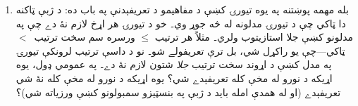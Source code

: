 \documentclass[../../../include/open-logic-section]{subfiles}
\begin{document}
\begin{explain}
\begin{enumerate}
  $\Gamma \setminus \{!A\} \Entails !A$ ثابت کړو۔ دا هم ثابتولے شو
  چې بديهي اصل زائد نۀ دے، که وښيو چې
  $(\Gamma \setminus \{!A\}) \cup \{\lnot !A\}$ د صدق وړ دے۔ د
  بېلګې په توګه، د هندسې د نورو بديهي اصولو څخه د موازي کرښو د اصل
  استقلال همداسې ښودل شوے و۔
\item بله مهمه پوښتنه په يوه تيورۍ کښې د مفاهيمو د تعريفېدنې په باب ده: د
  ژبې ټاکنه دا ټاکي چې د تيورۍ مدلونه له څه جوړ وي۔ خو د تيورۍ هر اړخ
  لازم نۀ دے چې په مدلونو کښې جلا استازيتوب ولري۔ مثلاً هر ترتيب
  $\le$ ورسره سم سخت ترتيب~$<$ ټاکي---چې يو راکړل شي، بل ترې تعريفولے
  شو۔ نو د داسې ترتيب لرونکې تيورۍ په مدل کښې د اړوند سخت ترتيب
  \emph{جلا} شتون لازم نۀ دے۔ په عمومي ډول، يوه اړيکه د نورو له مخې
  کله تعريفېدے شي؟ يوه اړيکه د نورو له مخې کله نۀ شي تعريفېدے (او له
  همدې امله بايد د ژبې په بنسټيزو سمبولونو کښې ورزياته شي)؟
\end{enumerate}
\end{explain}
\end{document}
